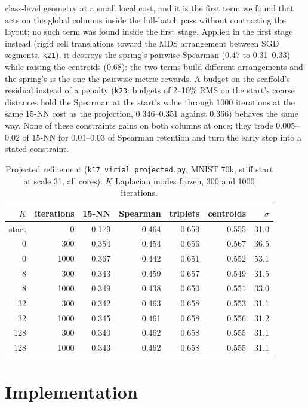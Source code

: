 \documentclass[11pt]{article}
\begin{document}
class-level geometry at a small local cost, and it is the first term we found that acts on the global
columns inside the full-batch pass without contracting the layout; no such term was found inside the
first stage. Applied in the first stage instead
(rigid cell translations toward the MDS arrangement between SGD segments, \texttt{k21}), it destroys the
spring's pairwise Spearman (0.47 to 0.31--0.33) while raising the centroids (0.68): the two terms build
different arrangements and the spring's is the one the pairwise metric rewards. A budget on the scaffold's residual instead of a penalty (\texttt{k23}: budgets of 2--10\% RMS on
the start's coarse distances hold the Spearman at the start's value through 1000 iterations at the same
15-NN cost as the projection, 0.346--0.351 against 0.366) behaves the same way. None of these
constraints gains on both columns at once; they trade 0.005--0.02 of 15-NN for 0.01--0.03 of Spearman
retention and turn the early stop into a stated constraint.

\begin{table}[t]
\centering\small
\caption{Projected refinement (\texttt{k17\_virial\_projected.py}, MNIST 70k, stiff start at scale 31,
all cores): $K$ Laplacian modes frozen, 300 and 1000 iterations.}
\label{tab:projected}
\begin{tabular}{rrrrrrr}
\toprule
$K$ & iterations & 15-NN & Spearman & triplets & centroids & $\sigma$ \\
\midrule
start & 0 & 0.179 & 0.464 & 0.659 & 0.555 & 31.0 \\
0 & 300 & 0.354 & 0.454 & 0.656 & 0.567 & 36.5 \\
0 & 1000 & 0.367 & 0.442 & 0.651 & 0.552 & 53.1 \\
8 & 300 & 0.343 & 0.459 & 0.657 & 0.549 & 31.5 \\
8 & 1000 & 0.349 & 0.438 & 0.650 & 0.551 & 33.0 \\
32 & 300 & 0.342 & 0.463 & 0.658 & 0.553 & 31.1 \\
32 & 1000 & 0.345 & 0.461 & 0.658 & 0.556 & 31.2 \\
128 & 300 & 0.340 & 0.462 & 0.658 & 0.555 & 31.1 \\
128 & 1000 & 0.343 & 0.462 & 0.658 & 0.555 & 31.1 \\
\bottomrule
\end{tabular}
\end{table}


\section{Implementation}\label{app:impl}
\end{document}
